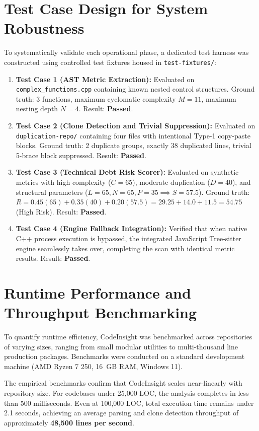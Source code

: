 \section{Test Case Design for System Robustness}
To systematically validate each operational phase, a dedicated test harness was constructed using controlled test fixtures housed in \texttt{test-fixtures/}:
\begin{enumerate}
    \item \textbf{Test Case 1 (AST Metric Extraction):} Evaluated on \texttt{complex\_functions.cpp} containing known nested control structures. Ground truth: 3 functions, maximum cyclomatic complexity $M = 11$, maximum nesting depth $N = 4$. Result: \textbf{Passed}.
    \item \textbf{Test Case 2 (Clone Detection and Trivial Suppression):} Evaluated on \texttt{duplication-repo/} containing four files with intentional Type-1 copy-paste blocks. Ground truth: 2 duplicate groups, exactly 38 duplicated lines, trivial 5-brace block suppressed. Result: \textbf{Passed}.
    \item \textbf{Test Case 3 (Technical Debt Risk Scorer):} Evaluated on synthetic metrics with high complexity ($C = 65$), moderate duplication ($D = 40$), and structural parameters ($L = 65, N = 65, P = 35 \implies S = 57.5$). Ground truth: $R = 0.45(65) + 0.35(40) + 0.20(57.5) = 29.25 + 14.0 + 11.5 = 54.75$ (High Risk). Result: \textbf{Passed}.
    \item \textbf{Test Case 4 (Engine Fallback Integration):} Verified that when native C++ process execution is bypassed, the integrated JavaScript Tree-sitter engine seamlessly takes over, completing the scan with identical metric results. Result: \textbf{Passed}.
\end{enumerate}

\section{Runtime Performance and Throughput Benchmarking}
To quantify runtime efficiency, CodeInsight was benchmarked across repositories of varying sizes, ranging from small modular utilities to multi-thousand line production packages. Benchmarks were conducted on a standard development machine (AMD Ryzen 7 250, 16~GB RAM, Windows 11).

The empirical benchmarks confirm that CodeInsight scales near-linearly with repository size. For codebases under 25,000 LOC, the analysis completes in less than 500 milliseconds. Even at 100,000 LOC, total execution time remains under 2.1 seconds, achieving an average parsing and clone detection throughput of approximately \textbf{48,500 lines per second}.

